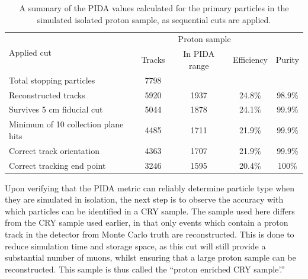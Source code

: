 \begin{table}
  \caption[A summary of the PIDA values calculated for the primary particles in the simulated isolated proton sample, as sequential cuts are applied]
          {A summary of the PIDA values calculated for the primary particles in the simulated isolated proton sample, as sequential cuts are applied.}
  \centering
  \label{tab:Isol_PIDA_PrimProton}
  \begin{tabular}{l c c c c}
    \toprule
    \multirow{2}{*}{Applied cut} & \multicolumn{3}{c}{Proton sample} \\ 
    \cmidrule{2-5}
      & Tracks & In PIDA range & Efficiency & Purity \\ 
    \midrule
      Total stopping particles            & 7798 &      &        & \\

      Reconstructed tracks                & 5920 & 1937 & 24.8\% & 98.9\% \\

      Survives 5 cm fiducial cut          & 5044 & 1878 & 24.1\% & 99.9\% \\

      Minimum of 10 collection plane hits & 4485 & 1711 & 21.9\% & 99.9\% \\

      Correct track orientation           & 4363 & 1707 & 21.9\% & 99.9\% \\

      Correct tracking end point          & 3246 & 1595 & 20.4\% & 100\%  \\
    \bottomrule
  \end{tabular}
\end{table}

Upon verifying that the PIDA metric can reliably determine particle type when they are simulated in isolation, the next step is to observe the accuracy with which particles can be identified in a CRY sample. The sample used here differs from the CRY sample used earlier, in that only events which contain a proton track in the detector from Monte Carlo truth are reconstructed. This is done to reduce simulation time and storage space, as this cut will still provide a substantial number of muons, whilst ensuring that a large proton sample can be reconstructed. This sample is thus called the ``proton enriched CRY sample'.'' \\


